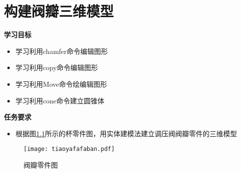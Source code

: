 \chapter{构建阀瓣三维模型}

{\bfseries 学习目标}
\begin{itemize}
\item 学习利用chamfer命令编辑图形
\item 学习利用copy命令编辑图形
\item 学习利用Move命令绘编辑图形
\item 学习利用cone命令建立圆锥体
\end{itemize}

{\bfseries 任务要求}
\begin{itemize}
\item 根据图\ref{fig:tiaoyafafaban}所示的杯零件图，用实体建模法建立调压阀阀瓣零件的三维模型
\end{itemize}

\noindent
\begin{figure}[htbp]
\centering
\texttt{[image: tiaoyafafaban.pdf]}
\caption{阀瓣零件图}\label{fig:tiaoyafafaban}
\end{figure}
\clearpage


\endinput